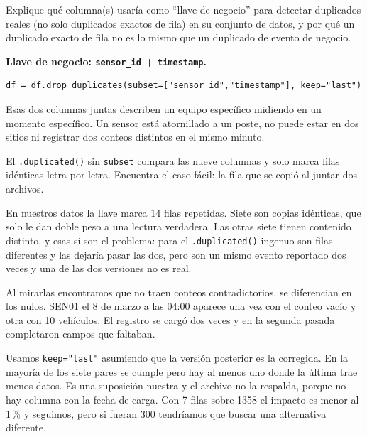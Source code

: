 \documentclass[11pt]{article}
\begin{document}
\begin{pregunta}
Explique qué columna(s) usaría como ``llave de negocio'' para detectar duplicados reales (no solo duplicados exactos de fila) en su conjunto de datos, y por qué un duplicado exacto de fila no es lo mismo que un duplicado de evento de negocio.
\end{pregunta}

\begin{respuesta}[Respuesta 2.6]
\noindent\textbf{Llave de negocio: \texttt{sensor\_id} + \texttt{timestamp}.}
\begin{verbatim}
df = df.drop_duplicates(subset=["sensor_id","timestamp"], keep="last")
\end{verbatim}

Esas dos columnas juntas describen un equipo específico midiendo en un momento específico. Un sensor está atornillado a un poste, no puede estar en dos sitios ni registrar dos conteos distintos en el mismo minuto.

\medskip
\noindent El \texttt{.duplicated()} sin \texttt{subset} compara las nueve columnas y solo marca filas idénticas letra por letra. Encuentra el caso fácil: la fila que se copió al juntar dos archivos.

En nuestros datos la llave marca 14 filas repetidas. Siete son copias idénticas, que solo le dan doble peso a una lectura verdadera. Las otras siete tienen contenido distinto, y esas sí son el problema: para el \texttt{.duplicated()} ingenuo son filas diferentes y las dejaría pasar las dos, pero son un mismo evento reportado dos veces y una de las dos versiones no es real.

Al mirarlas encontramos que no traen conteos contradictorios, se diferencian en los nulos. SEN01 el 8 de marzo a las 04:00 aparece una vez con el conteo vacío y otra con 10 vehículos. El registro se cargó dos veces y en la segunda pasada completaron campos que faltaban.

Usamos \texttt{keep="last"} asumiendo que la versión posterior es la corregida. En la mayoría de los siete pares se cumple pero hay al menos uno donde la última trae menos datos. Es una suposición nuestra y el archivo no la respalda, porque no hay columna con la fecha de carga. Con 7 filas sobre 1358 el impacto es menor al 1\,\% y seguimos, pero si fueran 300 tendríamos que buscar una alternativa diferente.
\end{respuesta}


\end{document}

